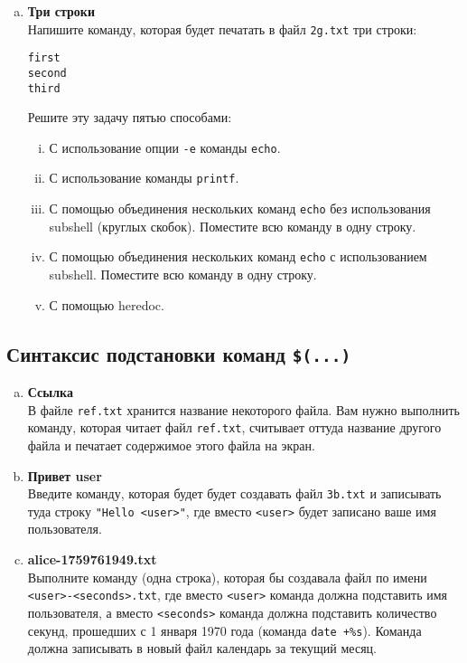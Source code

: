 \documentclass{article}
\begin{document}
\begin{enumerate}[a.]
\newpage
\item \textbf{Три строки}\\
Напишите команду, которая будет печатать в файл \texttt{2g.txt} три строки:
\begin{lstlisting}
first
second
third
\end{lstlisting}
Решите эту задачу пятью способами:
\begin{enumerate}[i.]
\item С использование опции \texttt{-e} команды \texttt{echo}.
\item С использование команды \texttt{printf}.
\item С помощью объединения нескольких команд \texttt{echo} без использования subshell (круглых скобок). Поместите всю команду в одну строку.
\item С помощью объединения нескольких команд \texttt{echo} с использованием subshell. Поместите всю команду в одну строку.
\item С помощью heredoc.
\end{enumerate}
\end{enumerate}


\subsection{Синтаксис подстановки команд \texttt{\$(...)}}
\begin{enumerate}[a.]

\item \textbf{Ссылка}\\
В файле \texttt{ref.txt} хранится название некоторого файла. Вам нужно выполнить команду, которая читает файл \texttt{ref.txt}, считывает оттуда название другого файла и печатает содержимое этого файла на экран.

\item \textbf{Привет user}\\
Введите команду, которая будет будет создавать файл \texttt{3b.txt} и записывать туда строку \texttt{"Hello <user>"}, где вместо \texttt{<user>} будет записано ваше имя пользователя.

\item \textbf{alice-1759761949.txt}\\
Выполните команду (одна строка), которая бы создавала файл по имени \texttt{<user>-<seconds>.txt}, где вместо \texttt{<user>} команда должна подставить имя пользователя, а вместо \texttt{<seconds>} команда должна подставить количество секунд, прошедших с 1 января 1970 года (команда \texttt{date +\%s}). Команда должна записывать в новый файл календарь за текущий месяц.

\end{enumerate}
\end{document}
